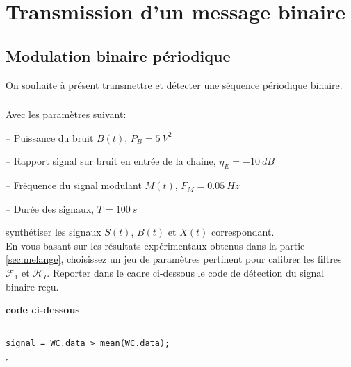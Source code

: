\documentclass{article}
\newcommand{\debutrep}[1]{\color{blue}\begin{center} \hrulefill \textbf{ #1 } \hrulefill \end{center} }
\newcommand{\finrep}{\vspace*{5mm}\hfill $\square$\color{black}\vspace*{5mm}}
\begin{document}
\clearpage

\section{Transmission d'un message binaire}

\subsection{Modulation binaire périodique}

On souhaite à présent transmettre et détecter une séquence périodique binaire.\\

\subsubsection{}

Avec les paramètres suivant:\\[-3mm]
\begin{list}{-}{\setlength{\leftmargin}{3mm} \setlength{\labelwidth}{20mm} \setlength{\labelsep}{2mm} \setlength{\itemsep}{1mm} }
\item[--] Puissance du bruit $B(t)$, $\overline{P}_{B}  = 5~V^2$
\item[--] Rapport signal sur bruit en entrée de la chaine, $\eta_E = -10~dB$
\item[--] Fréquence du signal modulant $M(t)$, $F_M = 0.05~Hz$
\item[--] Durée des signaux, $T = 100~s$\\[-2mm]
\end{list}

synthétiser les  signaux $S(t)$,  $B(t)$ et $X(t)$ correspondant. \\

En vous basant sur les résultats expérimentaux obtenus dans la partie \ref{sec:melange}, choisissez un jeu de paramètres pertinent pour calibrer les filtres 
$\mathcal{F}_1$ et $\mathcal{H}_I$. Reporter dans le cadre ci-dessous le code  de détection du signal binaire reçu. 

\debutrep{code ci-dessous}
\begin{verbatim}

signal = WC.data > mean(WC.data);

\end{verbatim}
\finrep

\subsubsection{}
\end{document}

